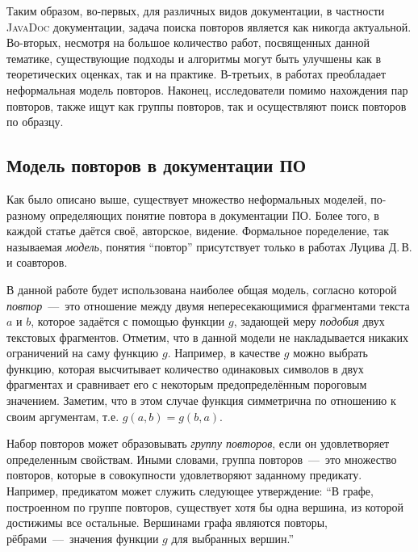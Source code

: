 Таким образом, во-первых, для различных видов документации, в частности \textsc{JavaDoc} документации, задача поиска повторов является как никогда актуальной.
Во-вторых, несмотря на большое количество работ, посвященных  данной тематике, существующие подходы и алгоритмы могут быть улучшены как в теоретических оценках, так и на практике.
В-третьих, в работах преобладает неформальная модель повторов.
Наконец, исследователи помимо нахождения пар повторов, также ищут как группы повторов, так и осуществляют поиск повторов по образцу.


\subsection{Модель повторов в документации ПО}\label{Model}
Как было описано выше, существует множество неформальных моделей, по-разному определяющих понятие {повтора} в документации ПО.
Более того, в каждой статье даётся своё, авторское, видение.
Формальное поределение, так называемая \emph{модель}, понятия ``повтор'' присутствует только в работах Луцива Д.\,В. и соавторов.

В данной работе будет использована наиболее общая модель, согласно которой \emph{повтор}~---~это отношение между двумя непересекающимися фрагментами текста $a$ и $b$, которое задаётся с помощью функции $g$, задающей меру \emph{подобия} двух текстовых фрагментов.
Отметим, что в данной модели не накладывается никаких ограничений на саму функцию $g$.
Например, в качестве $g$ можно выбрать функцию, которая высчитывает количество одинаковых символов в двух фрагментах и сравнивает его с некоторым предопределённым пороговым значением. %
Заметим, что в этом случае функция симметрична по отношению к своим аргументам, т.е. $g(a,b) = g(b,a)$.


Набор {повторов} может образовывать \emph{группу повторов}, если он удовлетворяет определенным свойствам.
Иными словами, {группа повторов}~---~это множество {повторов}, которые в совокупности удовлетворяют заданному предикату.
Например, предикатом может служить следующее утверждение: ``В графе, построенном по группе повторов, существует хотя бы одна вершина, из которой достижимы все остальные.
Вершинами графа являются повторы, рёбрами~---~значения функции $g$ для выбранных вершин.''



